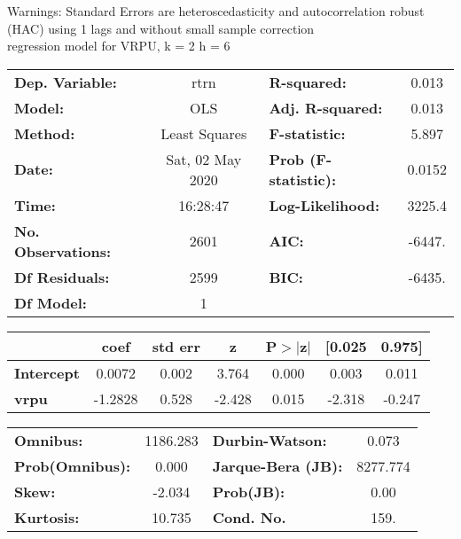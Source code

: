 Warnings: \newline
 [1] Standard Errors are heteroscedasticity and autocorrelation robust (HAC) using 1 lags and without small sample correction\\ 

regression model for VRPU, k = 2 h = 6\begin{center}
\begin{tabular}{lclc}
\toprule
\textbf{Dep. Variable:}    &       rtrn       & \textbf{  R-squared:         } &     0.013   \\
\textbf{Model:}            &       OLS        & \textbf{  Adj. R-squared:    } &     0.013   \\
\textbf{Method:}           &  Least Squares   & \textbf{  F-statistic:       } &     5.897   \\
\textbf{Date:}             & Sat, 02 May 2020 & \textbf{  Prob (F-statistic):} &   0.0152    \\
\textbf{Time:}             &     16:28:47     & \textbf{  Log-Likelihood:    } &    3225.4   \\
\textbf{No. Observations:} &        2601      & \textbf{  AIC:               } &    -6447.   \\
\textbf{Df Residuals:}     &        2599      & \textbf{  BIC:               } &    -6435.   \\
\textbf{Df Model:}         &           1      & \textbf{                     } &             \\
\bottomrule
\end{tabular}
\begin{tabular}{lcccccc}
                   & \textbf{coef} & \textbf{std err} & \textbf{z} & \textbf{P$> |$z$|$} & \textbf{[0.025} & \textbf{0.975]}  \\
\midrule
\textbf{Intercept} &       0.0072  &        0.002     &     3.764  &         0.000        &        0.003    &        0.011     \\
\textbf{vrpu}      &      -1.2828  &        0.528     &    -2.428  &         0.015        &       -2.318    &       -0.247     \\
\bottomrule
\end{tabular}
\begin{tabular}{lclc}
\textbf{Omnibus:}       & 1186.283 & \textbf{  Durbin-Watson:     } &    0.073  \\
\textbf{Prob(Omnibus):} &   0.000  & \textbf{  Jarque-Bera (JB):  } & 8277.774  \\
\textbf{Skew:}          &  -2.034  & \textbf{  Prob(JB):          } &     0.00  \\
\textbf{Kurtosis:}      &  10.735  & \textbf{  Cond. No.          } &     159.  \\
\bottomrule
\end{tabular}
\end{center}

